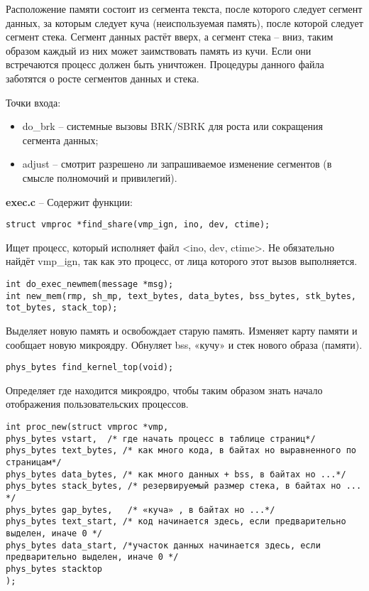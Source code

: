 Расположение памяти состоит из сегмента текста, после которого следует сегмент данных, за которым следует куча (неиспользуемая память), после которой следует сегмент стека. Сегмент данных растёт вверх, а сегмент стека -- вниз, таким образом каждый из них может заимствовать память из кучи. Если они встречаются процесс должен быть уничтожен. Процедуры данного файла заботятся о росте сегментов данных и стека.

Точки входа:
\begin{itemize}
\item do\_brk -- системные вызовы BRK/SBRK для роста или сокращения сегмента данных;
\item adjust -- смотрит разрешено ли запрашиваемое изменение сегментов (в смысле полномочий и привилегий).
\end{itemize}

\textbf{exec.c} -- Содержит функции:
\begin{Verbatim}[frame=single]
struct vmproc *find_share(vmp_ign, ino, dev, ctime);
\end{Verbatim}
Ищет процесс, который исполняет файл <ino, dev, ctime>.
Не обязательно найдёт vmp\_ign, так как это процесс, от лица которого этот вызов выполняется.

\begin{Verbatim}[frame=single]
int do_exec_newmem(message *msg);
int new_mem(rmp, sh_mp, text_bytes, data_bytes, bss_bytes, stk_bytes, tot_bytes, stack_top);
\end{Verbatim}
Выделяет новую память и освобождает старую память.
Изменяет карту памяти и сообщает новую микроядру. Обнуляет bss, «кучу» и стек нового образа (памяти).

\begin{Verbatim}[frame=single]
phys_bytes find_kernel_top(void);
\end{Verbatim}
Определяет где находится микроядро, чтобы таким образом знать начало отображения пользовательских процессов.

\begin{Verbatim}[frame=single]
int proc_new(struct vmproc *vmp,
phys_bytes vstart,	/* где начать процесс в таблице страниц*/ phys_bytes text_bytes, /* как много кода, в байтах но выравненного по страницам*/
phys_bytes data_bytes, /* как много данных + bss, в байтах но ...*/ phys_bytes stack_bytes, /* резервируемый размер стека, в байтах но ... */
phys_bytes gap_bytes,   /* «куча» , в байтах но ...*/
phys_bytes text_start, /* код начинается здесь, если предварительно выделен, иначе 0 */
phys_bytes data_start, /*участок данных начинается здесь, если предварительно выделен, иначе 0 */
phys_bytes stacktop
);
\end{Verbatim}

